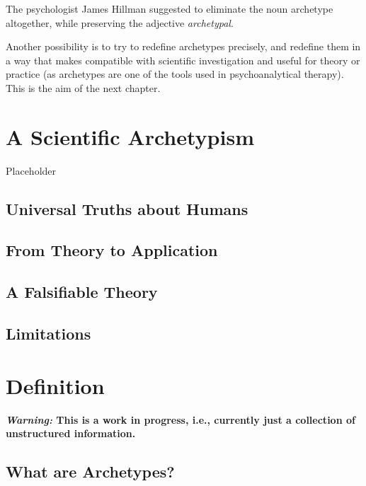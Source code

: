 \documentclass[
]{book}
\begin{document}
The psychologist James Hillman suggested to eliminate the noun archetype altogether, while preserving the adjective \emph{archetypal}.

Another possibility is to try to redefine archetypes precisely, and redefine them in a way that makes compatible with scientific investigation and useful for theory or practice (as archetypes are one of the tools used in psychoanalytical therapy). This is the aim of the next chapter.

\hypertarget{a-scientific-archetypism}{%
\chapter{A Scientific Archetypism}\label{a-scientific-archetypism}}

Placeholder

\hypertarget{universal-truths-about-humans}{%
\section{Universal Truths about Humans}\label{universal-truths-about-humans}}

\hypertarget{from-theory-to-application}{%
\section{From Theory to Application}\label{from-theory-to-application}}

\hypertarget{a-falsifiable-theory}{%
\section{A Falsifiable Theory}\label{a-falsifiable-theory}}

\hypertarget{limitations}{%
\section{Limitations}\label{limitations}}

\hypertarget{definition}{%
\chapter{Definition}\label{definition}}

\textbf{\emph{Warning:} This is a work in progress, i.e., currently just a collection of unstructured information.}

\hypertarget{what-are-archetypes}{%
\section{What are Archetypes?}\label{what-are-archetypes}}
\end{document}
